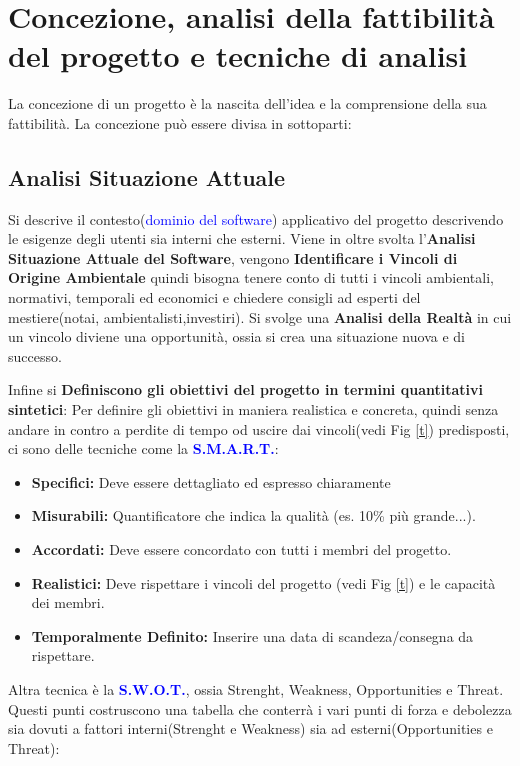 \documentclass{report}
\begin{document}
\section{Concezione, analisi della fattibilità del progetto e tecniche di analisi}
La concezione di un progetto è la nascita dell'idea e la comprensione della sua fattibilità.
La concezione può essere divisa in sottoparti:

\subsection{Analisi Situazione Attuale}
Si descrive il contesto(\textcolor{blue}{dominio del software}) applicativo del progetto descrivendo le esigenze degli utenti sia interni che esterni.
Viene in oltre svolta l'\textbf{Analisi Situazione Attuale del Software}, vengono \textbf{Identificare i Vincoli di Origine Ambientale} quindi bisogna tenere conto di tutti i vincoli ambientali, normativi, temporali ed economici e chiedere consigli ad esperti del mestiere(notai, ambientalisti,investiri).
Si svolge una \textbf{Analisi della Realtà} in cui un vincolo diviene una opportunità, ossia si crea una situazione nuova e di successo.

Infine si \textbf{Definiscono gli obiettivi del progetto in termini quantitativi sintetici}:
Per definire gli obiettivi in maniera realistica e concreta, quindi senza andare in contro a perdite di tempo od uscire dai vincoli(vedi Fig \ref{t}) predisposti, ci sono delle tecniche come
la \textbf{\textcolor{blue}{S.M.A.R.T.}}:
\begin{itemize}
	\item \textbf{Specifici:} Deve essere dettagliato ed espresso chiaramente
	\item \textbf{Misurabili:} Quantificatore che indica la qualità (es. 10\% più grande...).
	\item \textbf{Accordati:} Deve essere concordato con tutti i membri del progetto.
	\item \textbf{Realistici:} Deve rispettare i vincoli del progetto (vedi Fig \ref{t}) e le 										capacità dei membri.
	\item \textbf{Temporalmente Definito:} Inserire una data di scandeza/consegna da rispettare.
\end{itemize}
Altra tecnica è la \textbf{\textcolor{blue}{S.W.O.T.}}, ossia Strenght, Weakness, Opportunities e Threat.
Questi punti costruscono una tabella che conterrà i vari punti di forza e debolezza sia dovuti a fattori interni(Strenght e Weakness) sia ad esterni(Opportunities e Threat):
\end{document}
